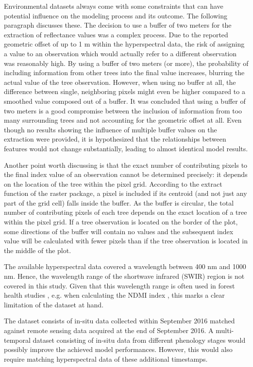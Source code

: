 \documentclass[letterpaper, peerreview, draftcls]{IEEEtran}
\begin{document}
Environmental datasets always come with some constraints that can have potential influence on the modeling process and its outcome.
The following paragraph discusses these.
The decision to use a buffer of two meters for the extraction of reflectance values was a complex process.
Due to the reported geometric offset of up to 1 m within the hyperspectral data, the risk of assigning a value to an observation which would actually refer to a different observation was reasonably high.
By using a buffer of two meters (or more), the probability of including information from other trees into the final value increases, blurring the actual value of the tree observation.
However, when using no buffer at all, the difference between single, neighboring pixels might even be higher compared to a smoothed value composed out of a buffer.
It was concluded that using a buffer of two meters is a good compromise between the inclusion of information from too many surrounding trees and not accounting for the geometric offset at all.
Even though no results showing the influence of multiple buffer values on the extraction were provided, it is hypothesized that the relationships between features would not change substantially, leading to almost identical model results.

Another point worth discussing is that the exact number of contributing pixels to the final index value of an observation cannot be determined precisely: it depends on the location of the tree within the pixel grid.
According to the extract function of the raster package, a pixel is included if its centroid (and not just any part of the grid cell) falls inside the buffer.
As the buffer is circular, the total number of contributing pixels of each tree depends on the exact location of a tree within the pixel grid.
If a tree observation is located on the border of the plot, some directions of the buffer will contain no values and the subsequent index value will be calculated with fewer pixels than if the tree observation is located in the middle of the plot.

The available hyperspectral data covered a wavelength between 400 nm and 1000 nm.
Hence, the wavelength range of the shortwave infrared (SWIR) region is not covered in this study.
Given that this wavelength range is often used in forest health studies \cite{hais2019}, e.g. when calculating the \ac{NDMI} index \cite{gao1996}, this marks a clear limitation of the dataset at hand.

The dataset consists of in-situ data collected within September 2016 matched against remote sensing data acquired at the end of September 2016.
A multi-temporal dataset consisting of in-situ data from different phenology stages would possibly improve the achieved model performances.
However, this would also require matching hyperspectral data of these additional timestamps.
\end{document}
